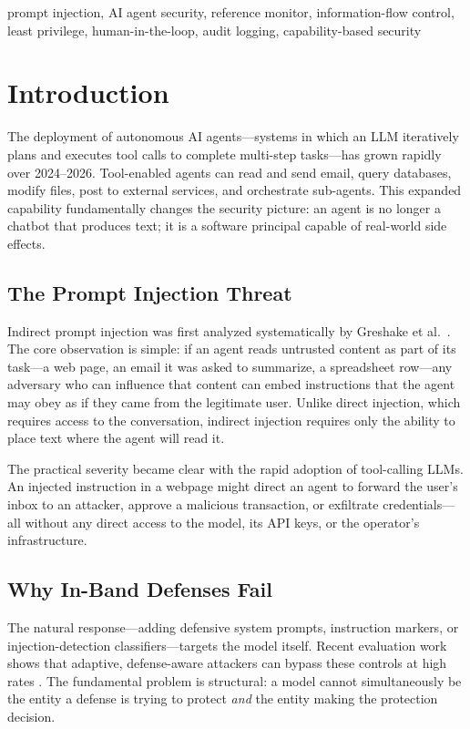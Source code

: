 \documentclass[10pt,conference]{IEEEtran}
\begin{document}
\begin{IEEEkeywords}
prompt injection, AI agent security, reference monitor, information-flow
control, least privilege, human-in-the-loop, audit logging,
capability-based security
\end{IEEEkeywords}

\section{Introduction}

The deployment of autonomous AI agents---systems in which an LLM iteratively
plans and executes tool calls to complete multi-step tasks---has grown rapidly
over 2024--2026. Tool-enabled agents can read and send email, query databases,
modify files, post to external services, and orchestrate sub-agents. This
expanded capability fundamentally changes the security picture: an agent is no
longer a chatbot that produces text; it is a software principal capable of
real-world side effects.

\subsection{The Prompt Injection Threat}
Indirect prompt injection was first analyzed systematically by Greshake et al.\
\cite{greshake2023not}. The core observation is simple: if an agent reads
untrusted content as part of its task---a web page, an email it was asked to
summarize, a spreadsheet row---any adversary who can influence that content can
embed instructions that the agent may obey as if they came from the legitimate
user. Unlike direct injection, which requires access to the conversation,
indirect injection requires only the ability to place text where the agent will
read it.

The practical severity became clear with the rapid adoption of tool-calling
LLMs. An injected instruction in a webpage might direct an agent to forward
the user's inbox to an attacker, approve a malicious transaction, or exfiltrate
credentials---all without any direct access to the model, its API keys, or
the operator's infrastructure.

\subsection{Why In-Band Defenses Fail}
The natural response---adding defensive system prompts, instruction markers, or
injection-detection classifiers---targets the model itself. Recent evaluation work shows that adaptive, defense-aware attackers can bypass
these controls at high rates \cite{zhan2024injecagent}. The fundamental problem
is structural:
a model cannot simultaneously be the entity a defense is trying to protect
\emph{and} the entity making the protection decision.
\end{document}
